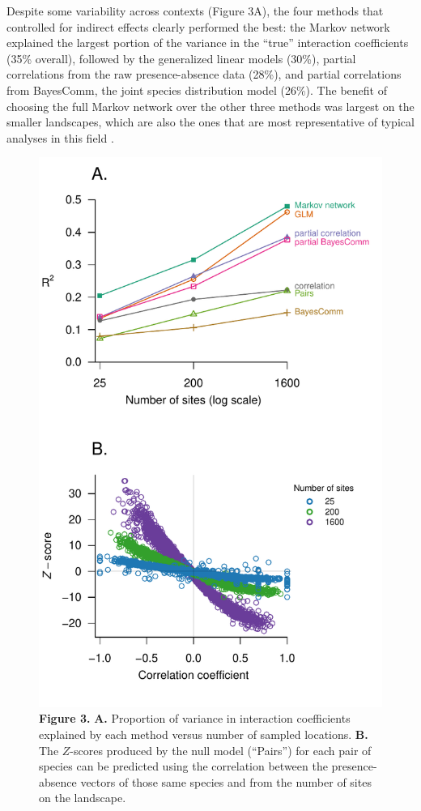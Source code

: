 Despite some variability across contexts (Figure 3A), the four methods
that controlled for indirect effects clearly performed the best: the
Markov network explained the largest portion of the variance in the
``true'' interaction coefficients (35\% overall), followed by the
generalized linear models (30\%), partial correlations from the raw
presence-absence data (28\%), and partial correlations from BayesComm,
the joint species distribution model (26\%). The benefit of choosing the
full Markov network over the other three methods was largest on the
smaller landscapes, which are also the ones that are most representative
of typical analyses in this field \citep{gotelli_empirical_2009}.

\begin{figure}[htbp]
\centering
\includegraphics{figures/performance.pdf}
\caption{\textbf{Figure 3.} \textbf{A.} Proportion of variance in
interaction coefficients explained by each method versus number of
sampled locations. \textbf{B.} The \(Z\)-scores produced by the null
model (``Pairs'') for each pair of species can be predicted using the
correlation between the presence-absence vectors of those same species
and from the number of sites on the landscape.}
\end{figure}

